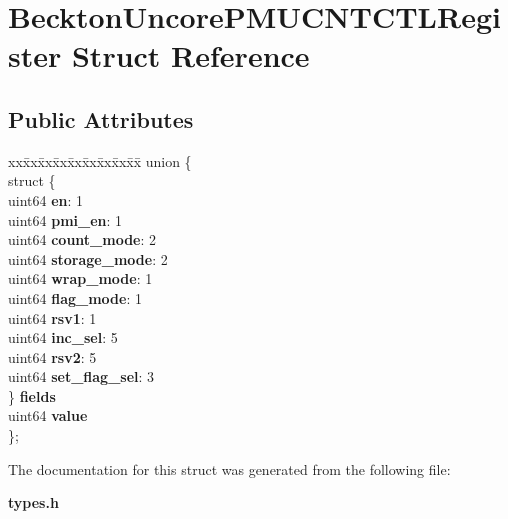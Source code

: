 \section{Beckton\+Uncore\+P\+M\+U\+C\+N\+T\+C\+T\+L\+Register Struct Reference}
\label{structBecktonUncorePMUCNTCTLRegister}
\subsection*{Public Attributes}
\begin{DoxyCompactItemize}
\item 
\mbox{\label{structBecktonUncorePMUCNTCTLRegister_a583e07b5c757740d046a891a11e1e8e6}} 
\begin{tabbing}
xx\=xx\=xx\=xx\=xx\=xx\=xx\=xx\=xx\=\kill
union \{\\
\>struct \{\\
\>\>uint64 {\bfseries en}: 1\\
\>\>uint64 {\bfseries pmi\_en}: 1\\
\>\>uint64 {\bfseries count\_mode}: 2\\
\>\>uint64 {\bfseries storage\_mode}: 2\\
\>\>uint64 {\bfseries wrap\_mode}: 1\\
\>\>uint64 {\bfseries flag\_mode}: 1\\
\>\>uint64 {\bfseries rsv1}: 1\\
\>\>uint64 {\bfseries inc\_sel}: 5\\
\>\>uint64 {\bfseries rsv2}: 5\\
\>\>uint64 {\bfseries set\_flag\_sel}: 3\\
\>\} {\bfseries fields}\\
\>uint64 {\bfseries value}\\
\}; \\

\end{tabbing}\end{DoxyCompactItemize}


The documentation for this struct was generated from the following file\+:\begin{DoxyCompactItemize}
\item 
\textbf{ types.\+h}\end{DoxyCompactItemize}

